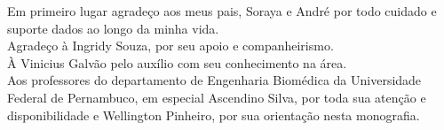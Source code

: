 \begin{agradecimentos}
\begin{flushright}
\parbox{0.65\linewidth}{
\itshape \flushright

Em primeiro lugar agradeço aos meus pais, Soraya e André por todo cuidado e suporte dados ao longo da minha vida.\\
\vspace{0.5 in}
Agradeço à Ingridy Souza, por seu apoio e companheirismo.\\
\vspace{0.5cm}
À Vinicius Galvão pelo auxílio com seu conhecimento na área.\\
\vspace{0.5cm}
Aos professores do departamento de Engenharia Biomédica da Universidade Federal de Pernambuco, 
em especial Ascendino Silva, por toda sua atenção e disponibilidade e Wellington Pinheiro, 
por sua orientação nesta monografia.
}
\end{flushright}
\end{agradecimentos}
